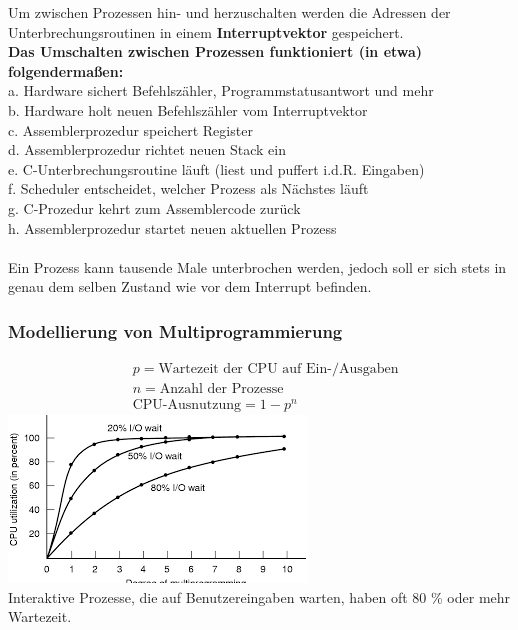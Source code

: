 \documentclass[12pt,a4paper]{univention}
\begin{document}
Um zwischen Prozessen hin- und herzuschalten werden die Adressen der Unterbrechungsroutinen in einem \textbf{Interruptvektor} gespeichert.\\ \textbf{Das Umschalten zwischen Prozessen funktioniert (in etwa) folgendermaßen:}\\
a. Hardware sichert Befehlszähler, Programmstatusantwort und mehr\\
b. Hardware holt neuen Befehlszähler vom Interruptvektor\\
c. Assemblerprozedur speichert Register\\
d. Assemblerprozedur richtet neuen Stack ein\\
e. C-Unterbrechungsroutine läuft (liest und puffert i.d.R. Eingaben)\\
f. Scheduler entscheidet, welcher Prozess als Nächstes läuft\\
g. C-Prozedur kehrt zum Assemblercode zurück\\
h. Assemblerprozedur startet neuen aktuellen Prozess\\\\
Ein Prozess kann tausende Male unterbrochen werden, jedoch soll er sich stets in genau dem selben Zustand wie vor dem Interrupt befinden.
\subsubsection{Modellierung von Multiprogrammierung}
\begin{align*}
&p = \text{Wartezeit der CPU auf Ein-/Ausgaben}\\
&n = \text{Anzahl der Prozesse}\\
&\text{CPU-Ausnutzung} = 1-p^{n}
\end{align*}
\includegraphics[scale=1]{multiprogramming.png}\\
Interaktive Prozesse, die auf Benutzereingaben warten, haben oft 80 \% oder mehr Wartezeit.
\end{document}
